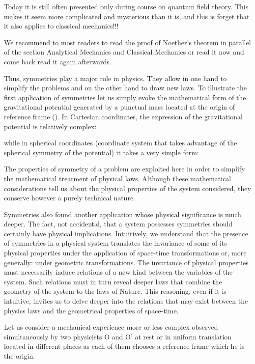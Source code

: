 	Today it is still often presented only during course on quantum field theory. This makes it seem more complicated and mysterious than it is, and this is forget that it also applies to classical mechanics!!!
	\begin{tcolorbox}[title=Remark,colframe=black,arc=10pt]
	We recommend to most readers to read the proof of Noether's theorem in parallel of the section Analytical Mechanics and Classical Mechanics or read it now and come back read it again afterwards.
	\end{tcolorbox}
	Thus, symmetries play a major role in physics. They allow in one hand to simplify the problems and on the other hand to draw new laws. To illustrate the first application of symmetries let us simply evoke the mathematical form of the gravitational potential generated by a punctual mass located at the origin of reference frame (). In Cartesian coordinates, the expression of the gravitational potential is relatively complex:
	
	while in spherical coordinates (coordinate system that takes advantage of the spherical symmetry of the potential) it takes a very simple form:
	
	The properties of symmetry of a problem are exploited here in order to simplify the mathematical treatment of physical laws. Although these mathematical considerations tell us about the physical properties of the system considered, they conserve however a purely technical nature.
	
	Symmetries also found another application whose physical significance is much deeper. The fact, not accidental, that a system possesses symmetries should certainly have physical implications. Intuitively, we understand that the presence of symmetries in a physical system translates the invariance of some of its physical properties under the application of space-time transformations or, more generally: under geometric transformations. The invariance of physical properties must necessarily induce relations of a new kind between the variables of the system. Such relations must in turn reveal deeper laws that combine the geometry of the system to the laws of Nature. This reasoning, even if it is intuitive, invites us to delve deeper into the relations that may exist between the physics laws and the geometrical properties of space-time.
	
	Let us consider a mechanical experience more or less complex observed simultaneously  by two physicists O and O' at rest or in uniform translation located in different places as each of them chooses a reference frame which he is the origin.


